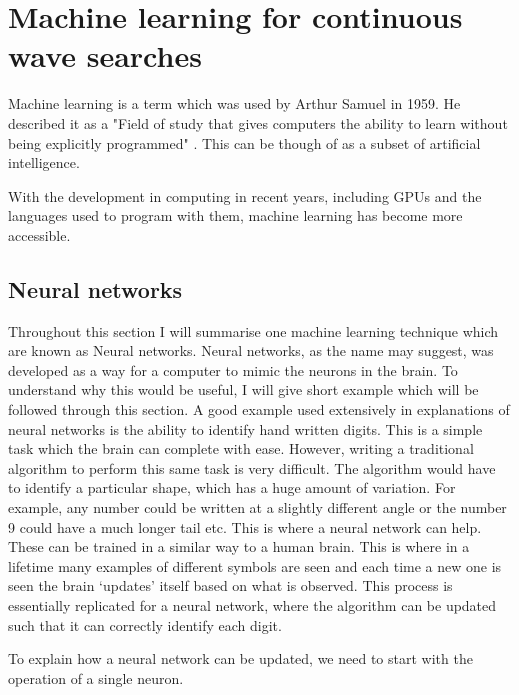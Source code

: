 \chapter{\label{cnn} Machine learning for continuous wave searches}


Machine learning is a term which was used by Arthur Samuel in 1959. 
He described it as a "Field of study that gives computers the ability to learn without being explicitly programmed" \citep{}.
This can be though of as a subset of artificial intelligence. 

With the development in computing in recent years, including GPUs and the languages used to program with them, machine learning has become more accessible. 

\section{\label{machine:nn}Neural networks}


Throughout this section I will summarise one machine learning technique which are known as Neural networks. 
Neural networks, as the name may suggest, was developed as a way for a computer to mimic the neurons in the brain.
To understand why this would be useful, I will give short example which will be followed through this section.
A good example used extensively in explanations of neural networks is the ability to identify hand written digits.
This is a simple task which the brain can complete with ease. 
However, writing a traditional algorithm to perform this same task is very difficult. 
The algorithm would have to identify a particular shape, which has a huge amount of variation.
For example, any number could be written at a slightly different angle or the number 9 could have a much longer tail etc.
This is where a neural network can help. 
These can be trained in a similar way to a human brain. 
This is where in a lifetime many examples of different symbols are seen and each time a new one is seen the brain `updates' itself based on what is observed. 
This process is essentially replicated for a neural network, where the algorithm can be updated such that it can correctly identify each digit.

To explain how a neural network can be updated, we need to start with the operation of a single neuron.


